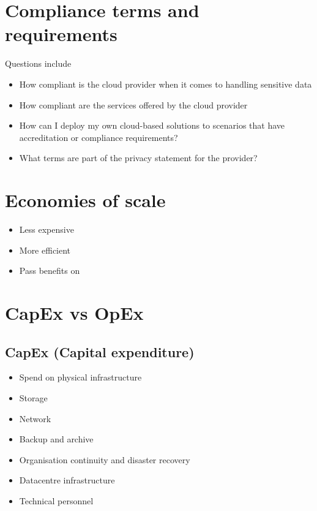 \documentclass{article}[18pt]
\begin{document}
\hypertarget{compliance-terms-and-requirements}{%
	\section{Compliance terms and
		requirements}\label{compliance-terms-and-requirements}}

Questions include

\begin{itemize}
	\tightlist
	\item
	How compliant is the cloud provider when it comes to handling
	sensitive data
	\item
	How compliant are the services offered by the cloud provider
	\item
	How can I deploy my own cloud-based solutions to scenarios that have
	accreditation or compliance requirements?
	\item
	What terms are part of the privacy statement for the provider?
\end{itemize}

\hypertarget{economies-of-scale}{%
	\section{Economies of scale}\label{economies-of-scale}}

\begin{itemize}
	\tightlist
	\item
	Less expensive
	\item
	More efficient
	\item
	Pass benefits on
\end{itemize}

\hypertarget{capex-vs-opex}{%
	\section{CapEx vs OpEx}\label{capex-vs-opex}}

\subsection{CapEx (Capital expenditure)}

\begin{itemize}
	\tightlist
	\item
	Spend on physical infrastructure
	\item
	Storage
	\item
	Network
	\item
	Backup and archive
	\item
	Organisation continuity and disaster recovery
	\item
	Datacentre infrastructure
	\item
	Technical personnel
\end{itemize}
\end{document}
